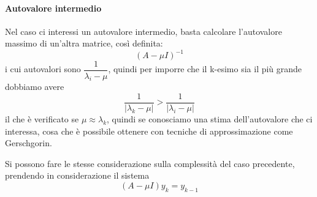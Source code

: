 


\paragraph{Autovalore intermedio}
Nel caso ci interessi un autovalore intermedio, basta calcolare
l'autovalore massimo di un'altra matrice, così definita:
$$ (A − \mu I)^{-1} $$
i cui autovalori sono $\dfrac{1}{\lambda_i - \mu}$, quindi per imporre
che il k-esimo sia il più grande dobbiamo avere 
$$ \dfrac{1}{|\lambda_k - \mu|} > \dfrac{1}{|\lambda_i - \mu|} $$
il che è verificato se $\mu \approx \lambda_k$, quindi se conosciamo
una stima dell'autovalore che ci interessa, cosa che è
possibile ottenere con tecniche di approssimazione come Gerschgorin.

Si possono fare le stesse considerazione sulla complessità del caso
precedente, prendendo in considerazione il sistema 
$$ (A − \mu I) y_k = y_{k-1} $$


